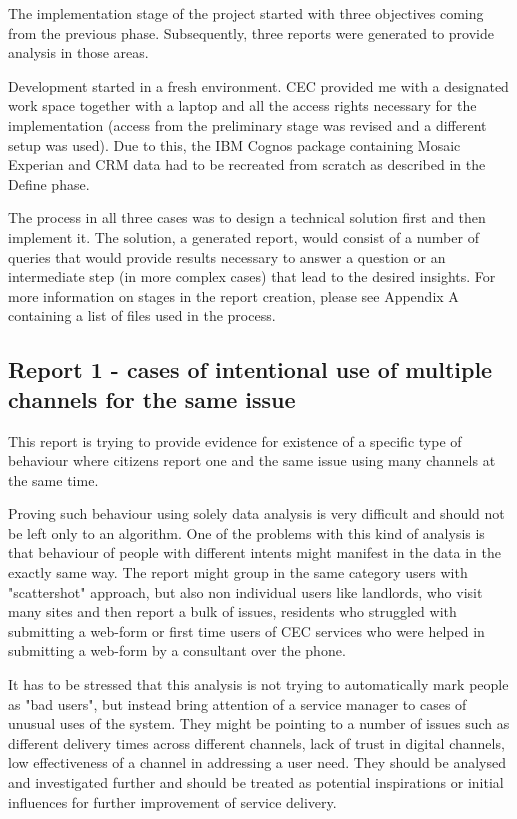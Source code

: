 The implementation stage of the project started with three objectives coming from the previous phase. Subsequently, three reports were generated to provide analysis in those areas.

Development started in a fresh environment. CEC provided me with a designated work space together with a laptop and all the access rights necessary for the implementation (access from the preliminary stage was revised and a different setup was used). Due to this, the IBM Cognos package containing Mosaic Experian and CRM data had to be recreated from scratch as described in the Define phase.

The process in all three cases was to design a technical solution first and then implement it. The solution, a generated report, would consist of a number of queries that would provide results necessary to answer a question or an intermediate step (in more complex cases) that lead to the desired insights. For more information on stages in the report creation, please see Appendix A containing a list of files used in the process.
	
		\subsection{Report 1 - cases of intentional use of multiple channels for the same issue}
		
This report is trying to provide evidence for existence of a specific type of behaviour where citizens report one and the same issue using many channels at the same time.

Proving such behaviour using solely data analysis is very difficult and should not be left only to an algorithm. One of the problems with this kind of analysis is that behaviour of people with different intents might manifest in the data in the exactly same way. The report might group in the same category users with "scattershot" approach, but also non individual users like landlords, who visit many sites and then report a bulk of issues, residents who struggled with submitting a web-form or first time users of CEC services who were helped in submitting a web-form by a consultant over the phone.

It has to be stressed that this analysis is not trying to automatically mark people as "bad users", but instead bring attention of a service manager to cases of unusual uses of the system. They might be pointing to a number of issues such as different delivery times across different channels, lack of trust in digital channels, low effectiveness of a channel in addressing a user need. They should be analysed and investigated further and should be treated as potential inspirations or initial influences for further improvement of service delivery.

